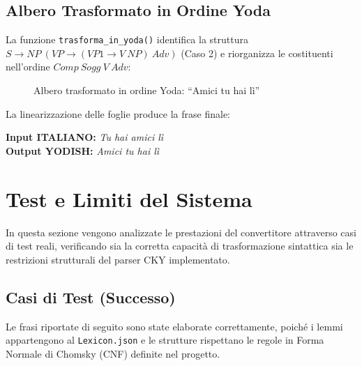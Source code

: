 \documentclass[12pt, a4paper]{article}
\begin{document}
\subsection{Albero Trasformato in Ordine Yoda}

La funzione \texttt{trasforma\_in\_yoda()} identifica la struttura
\\$S \rightarrow NP\ (VP \rightarrow (VP1 \rightarrow V\ NP)\ Adv)$
(Caso 2) e riorganizza le costituenti nell'ordine $Comp\ Sogg\ V\ Adv$:

\begin{figure}[H]
\centering
{}
\caption{Albero trasformato in ordine Yoda: ``Amici tu hai lì''}
\end{figure}

La linearizzazione delle foglie produce la frase finale:
\begin{center}
    \textbf{Input ITALIANO:} \textit{Tu hai amici lì} \\[0.3cm]
    \textbf{Output YODISH:} \textit{Amici tu hai lì}
\end{center}


\section{Test e Limiti del Sistema}

In questa sezione vengono analizzate le prestazioni del convertitore attraverso casi di test reali, verificando sia la corretta capacità di trasformazione sintattica sia le restrizioni strutturali del parser CKY implementato.

\subsection{Casi di Test (Successo)}
Le frasi riportate di seguito sono state elaborate correttamente, poiché i lemmi appartengono al \texttt{Lexicon.json} e le strutture rispettano le regole in Forma Normale di Chomsky (CNF) definite nel progetto.
\end{document}
